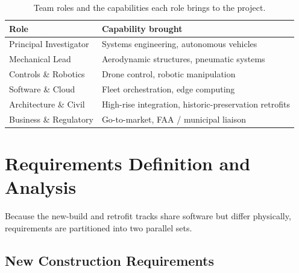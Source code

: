 \documentclass[11pt,a4paper]{report}
\begin{document}
\begin{table}[H]
\centering
\caption{Team roles and the capabilities each role brings to the project.}
\label{tab:team}
\small
\begin{tabularx}{\linewidth}{L{4.5cm} X}
\toprule
\textbf{Role} & \textbf{Capability brought} \\
\midrule
Principal Investigator     & Systems engineering, autonomous vehicles \\
Mechanical Lead            & Aerodynamic structures, pneumatic systems \\
Controls \& Robotics       & Drone control, robotic manipulation \\
Software \& Cloud          & Fleet orchestration, edge computing \\
Architecture \& Civil      & High-rise integration, historic-preservation retrofits \\
Business \& Regulatory     & Go-to-market, FAA / municipal liaison \\
\bottomrule
\end{tabularx}
\end{table}

\section{Requirements Definition and Analysis}
\label{sec:requirements}

Because the new-build and retrofit tracks share software but differ
physically, requirements are partitioned into two parallel sets.

\subsection{New Construction Requirements}
\label{ssec:req-new}
\end{document}
